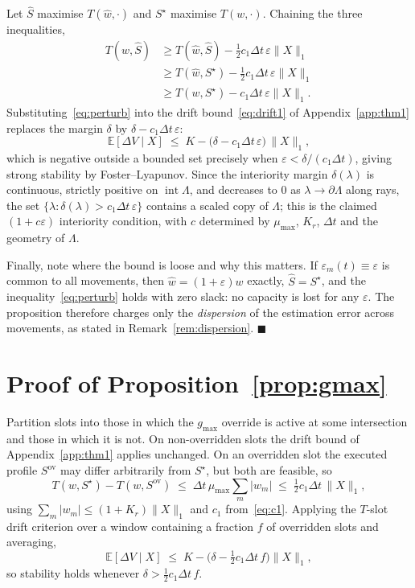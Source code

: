 \documentclass[journal]{IEEEtran}
\begin{document}
Let $\hat S$ maximise $T(\hat w,\cdot)$ and $S^\star$ maximise
$T(w,\cdot)$. Chaining the three inequalities,
\begin{align}
T(w,\hat S) &\ge T(\hat w,\hat S)
             - \tfrac12 c_1\Delta t\,\varepsilon\|X\|_1 \nonumber\\
            &\ge T(\hat w, S^\star)
             - \tfrac12 c_1\Delta t\,\varepsilon\|X\|_1 \nonumber\\
            &\ge T(w, S^\star) - c_1\Delta t\,\varepsilon\|X\|_1 .
\label{eq:perturb}
\end{align}
Substituting~\eqref{eq:perturb} into the drift bound~\eqref{eq:drift1} of
Appendix~\ref{app:thm1} replaces the margin $\delta$ by
$\delta - c_1\Delta t\,\varepsilon$:
\begin{equation}
\mathbb{E}[\Delta V\mid X] \;\le\; K
 - \big(\delta - c_1 \Delta t\, \varepsilon\big)\, \|X\|_1 ,
\end{equation}
which is negative outside a bounded set precisely when
$\varepsilon < \delta/(c_1\Delta t)$, giving strong stability by
Foster--Lyapunov. Since the interiority margin $\delta(\lambda)$ is
continuous, strictly positive on $\operatorname{int}\Lambda$, and
decreases to $0$ as $\lambda \to \partial\Lambda$ along rays, the set
$\{\lambda : \delta(\lambda) > c_1\Delta t\,\varepsilon\}$ contains a
scaled copy of $\Lambda$; this is the claimed $(1+c\varepsilon)$
interiority condition, with $c$ determined by $\mu_{\max}$, $K_r$,
$\Delta t$ and the geometry of $\Lambda$.

Finally, note where the bound is loose and why this matters. If
$\varepsilon_m(t)\equiv\varepsilon$ is common to all movements, then
$\hat w = (1+\varepsilon) w$ exactly, $\hat S = S^\star$, and the
inequality~\eqref{eq:perturb} holds with zero slack: no capacity is lost
for any $\varepsilon$. The proposition therefore charges only the
\emph{dispersion} of the estimation error across movements, as stated in
Remark~\ref{rem:dispersion}. \hfill$\blacksquare$

\section{Proof of Proposition~\ref{prop:gmax}}
\label{app:prop2}
Partition slots into those in which the $g_{\max}$ override is active at
some intersection and those in which it is not. On non-overridden slots
the drift bound of Appendix~\ref{app:thm1} applies unchanged. On an
overridden slot the executed profile $S^{\mathrm{ov}}$ may differ
arbitrarily from $S^\star$, but both are feasible, so
\begin{equation}
T(w,S^\star) - T(w,S^{\mathrm{ov}}) \;\le\;
 \Delta t\,\mu_{\max}\sum_m |w_m| \;\le\;
 \tfrac12 c_1 \Delta t\, \|X\|_1 ,
\end{equation}
using $\sum_m|w_m| \le (1+K_r)\|X\|_1$ and $c_1$ from~\eqref{eq:c1}.
Applying the $T$-slot drift criterion over a window containing a fraction
$f$ of overridden slots and averaging,
\begin{equation}
\mathbb{E}[\Delta V\mid X] \;\le\; K
 - \big(\delta - \tfrac12 c_1 \Delta t\, f\big)\|X\|_1 ,
\end{equation}
so stability holds whenever $\delta > \tfrac12 c_1\Delta t\, f$.
\end{document}
